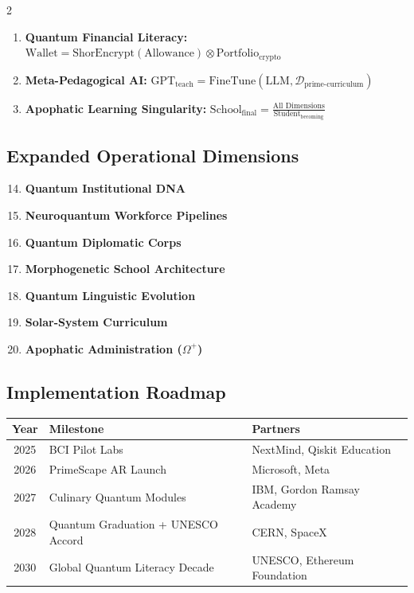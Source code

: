 \documentclass{article}
\theoremstyle{plain}
\theoremstyle{claimstyle}
\begin{document}
\begin{multicols}{2}
\begin{enumerate}
    \item \textbf{Quantum Financial Literacy:} \( \text{Wallet} = \text{ShorEncrypt}(\text{Allowance}) \otimes \text{Portfolio}_{\text{crypto}} \)
    \item \textbf{Meta-Pedagogical AI:} \( \text{GPT}_{\text{teach}} = \text{FineTune}(\text{LLM}, \mathcal{D}_{\text{prime-curriculum}}) \)
    \item \textbf{Apophatic Learning Singularity:} \( \text{School}_{\text{final}} = \frac{\text{All Dimensions}}{\text{Student}_{\text{becoming}}} \)
\end{enumerate}
\end{multicols}

\subsection{Expanded Operational Dimensions}
\begin{enumerate}
    \setcounter{enumi}{13}
    \item \textbf{Quantum Institutional DNA}
    \item \textbf{Neuroquantum Workforce Pipelines}
    \item \textbf{Quantum Diplomatic Corps}
    \item \textbf{Morphogenetic School Architecture}
    \item \textbf{Quantum Linguistic Evolution}
    \item \textbf{Solar-System Curriculum}
    \item \textbf{Apophatic Administration (\(\Omega^+\))}
\end{enumerate}

\subsection{Implementation Roadmap}
\begin{center}
\begin{tabular}{|c|l|l|}
\hline
\textbf{Year} & \textbf{Milestone} & \textbf{Partners} \\
\hline
2025 & BCI Pilot Labs & NextMind, Qiskit Education \\
2026 & PrimeScape AR Launch & Microsoft, Meta \\
2027 & Culinary Quantum Modules & IBM, Gordon Ramsay Academy \\
2028 & Quantum Graduation + UNESCO Accord & CERN, SpaceX \\
2030 & Global Quantum Literacy Decade & UNESCO, Ethereum Foundation \\
\hline
\end{tabular}
\end{center}
\end{document}
